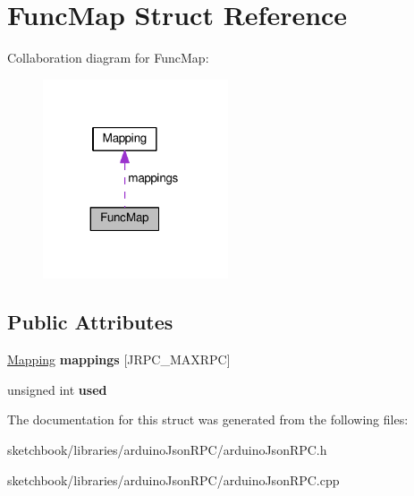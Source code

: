 \hypertarget{structFuncMap}{}\section{Func\+Map Struct Reference}
\label{structFuncMap}


Collaboration diagram for Func\+Map\+:\nopagebreak
\begin{figure}[H]
\begin{center}
\leavevmode
\includegraphics[width=155pt]{structFuncMap__coll__graph}
\end{center}
\end{figure}
\subsection*{Public Attributes}
\begin{DoxyCompactItemize}
\item 
\mbox{\label{structFuncMap_ad53d8c1e8ff7a75eefe1fa0dd4ccd9bc}} 
\hyperlink{structMapping}{Mapping} {\bfseries mappings} \mbox{[}J\+R\+P\+C\+\_\+\+M\+A\+X\+R\+PC\mbox{]}
\item 
\mbox{\label{structFuncMap_ac342e66255d678322bd31f5d1e4f29b9}} 
unsigned int {\bfseries used}
\end{DoxyCompactItemize}


The documentation for this struct was generated from the following files\+:\begin{DoxyCompactItemize}
\item 
sketchbook/libraries/arduino\+Json\+R\+P\+C/arduino\+Json\+R\+P\+C.\+h\item 
sketchbook/libraries/arduino\+Json\+R\+P\+C/arduino\+Json\+R\+P\+C.\+cpp\end{DoxyCompactItemize}
